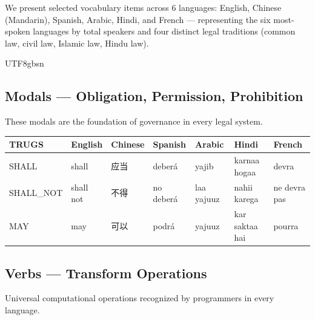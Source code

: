 \documentclass{article}
\begin{document}
We present selected vocabulary items across 6 languages: English, Chinese (Mandarin), Spanish, Arabic, Hindi, and French --- representing the six most-spoken languages by total speakers and four distinct legal traditions (common law, civil law, Islamic law, Hindu law).

\begin{CJK}{UTF8}{gbsn}

\small

\subsection{Modals --- Obligation, Permission, Prohibition}

These modals are the foundation of governance in every legal system.

\begin{table}[h]
\centering
\small
\begin{tabular}{lllllll}
\toprule
\textbf{TRUGS} & \textbf{English} & \textbf{Chinese} & \textbf{Spanish} & \textbf{Arabic} & \textbf{Hindi} & \textbf{French} \\
\midrule
SHALL & shall & 应当 & deber\'a & yajib & karnaa hogaa & devra \\
SHALL\_NOT & shall not & 不得 & no deber\'a & laa yajuuz & nahii karega & ne devra pas \\
MAY & may & 可以 & podr\'a & yajuuz & kar saktaa hai & pourra \\
\bottomrule
\end{tabular}
\end{table}

\subsection{Verbs --- Transform Operations}

Universal computational operations recognized by programmers in every language.


\end{CJK}
\end{document}

